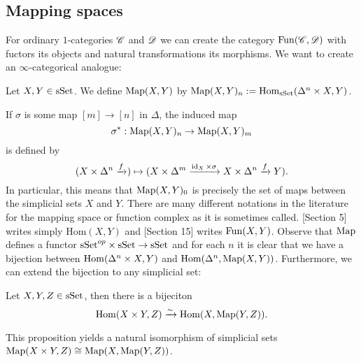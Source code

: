 \documentclass[../../thesis.tex]{subfiles}
\begin{document}
\subsection{Mapping spaces}
For ordinary $1$-categories $\mathscr{C}$ and $\mathscr{D}$ we can create the category $\mathrm{Fun}(\mathscr{C}, \mathscr{D})$ with fuctors its objects and natural transformations its morphisms.
We want to create an $\infty$-categorical analogue:
\begin{definition}
    Let $X, Y \in \mathrm{sSet}$.
    We define $\mathrm{Map}(X,Y)$ by $\mathrm{Map}(X,Y)_n : = \mathrm{Hom}_{\mathrm{sSet}}(\Delta^n \times X, Y)$.
\end{definition}
If $\sigma$ is some map $[m] \to [n]$ in $\Delta$, the induced map
\[
    \sigma^* : \mathrm{Map}(X,Y)_n \to \mathrm{Map}(X,Y)_m
\]
is defined by
\[
    (X \times \Delta^n \xrightarrow{f}) \mapsto (X \times \Delta^m \xrightarrow{\operatorname{id}_X \times \sigma}X \times \Delta^n \xrightarrow{f} Y).
\]
In particular, this means that $\mathrm{Map}(X,Y)_0$ is precisely the set of maps between the simplicial sets $X$ and $Y$.
There are many different notations in the literature for the mapping space or function complex as it is sometimes called.
\cite{GoerssJardine}[Section 5] writes simply $\mathrm{Hom}(X,Y)$ and \cite{Rezk}[Section 15] writes $\mathrm{Fun}(X,Y)$.
Observe that $\mathrm{Map}$ defines a functor $\mathrm{sSet}^{op}\times \mathrm{sSet} \to \mathrm{sSet}$ and for each $n$ it is clear that we have a bijection between $\mathrm{Hom}(\Delta^n \times X, Y)$ and $\mathrm{Hom}(\Delta^n, \mathrm{Map}(X,Y))$.
Furthermore, we can extend the bijection to any simplicial set:
\begin{proposition}
    Let $X,Y,Z \in \mathrm{sSet}$, then there is a bijeciton
    \[
        \mathrm{Hom}(X\times Y, Z) \xrightarrow{\sim} \mathrm{Hom}(X, \mathrm{Map}(Y,Z)).
    \]
\end{proposition}
This proposition yields a natural isomorphism of simplicial sets $\mathrm{Map}(X\times Y, Z) \cong \mathrm{Map}(X, \mathrm{Map}(Y,Z))$.
\end{document}

